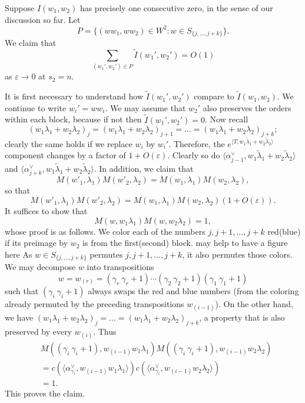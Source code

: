 \documentclass[11pt]{amsart}
\numberwithin{theorem}{section}
\numberwithin{equation}{section}
\theoremstyle{remark}
\theoremstyle{definition}
\begin{document}
{Suppose $I(w_1,w_2)$ has precisely one consecutive zero, in the sense of our discussion so far. Let
\begin{equation*}
P = \{(ww_1,ww_2) \in W^2: w \in S_{\{j,\ldots,j+k\}}\}.
\end{equation*}
We claim that
\begin{equation} \label{eq:cc}
\sum_{(w_1',w_2') \in P} \tilde I(w_1',w_2') = O(1)
\end{equation}
as $\varepsilon \rightarrow 0$ at $s_2=n$.

It is first necessary to understand how $\tilde I(w_1',w_2')$ compare to $\tilde I(w_1,w_2)$. We continue to write $w_i'=ww_i$. We may assume that $w_2'$ also preserves the orders within each block, because if not then $\tilde I(w_1',w_2')=0$. Now recall
\begin{equation*}
(w_1\lambda_1+w_2\lambda_2)_j = (w_1\lambda_1+w_2\lambda_2)_{j+1} = \ldots = (w_1\lambda_1+w_2\lambda_2)_{j+k};
\end{equation*}
clearly the same holds if we replace $w_i$ by $w_i'$. Therefore, the $e^{\langle T,w_1\tilde\lambda_1+w_2\tilde\lambda_2\rangle}$ component changes by a factor of $1+O(\varepsilon)$. Clearly so do $\langle \alpha^\vee_{j-1},w_1\tilde\lambda_1+w_2\tilde\lambda_2\rangle$ and $\langle \alpha^\vee_{j+k},w_1\tilde\lambda_1+w_2\tilde\lambda_2\rangle$. In addition, we claim that
\begin{equation*}
M(w'_1,\lambda_1)M(w'_2,\lambda_2) = M(w_1,\lambda_1)M(w_2,\lambda_2),
\end{equation*}
so that
\begin{equation*}
M(w'_1,\lambda_1)M(w'_2,\lambda_2) = M(w_1,\lambda_1)M(w_2,\lambda_2)(1+O(\varepsilon)).
\end{equation*}
It suffices to show that
\begin{equation*}
M(w,w_1\lambda_1)M(w,w_2\lambda_2)=1,
\end{equation*}
whose proof is as follows. 
We color each of the numbers $j,j+1,\ldots,j+k$ red(blue) if its preimage by $w_2$ is from the first(second) block. {\color{red} may help to have a figure here} As $w \in S_{\{j,\ldots,j+k\}}$ permutes $j,j+1,\ldots,j+k$, it also permutes those colors. We may decompose $w$ into transpositions
\begin{equation*}
w = w_{(r)} = (\gamma_r\ \gamma_r+1) \cdots (\gamma_2 \ \gamma_2+1)(\gamma_1 \ \gamma_1+1)
\end{equation*}
such that $(\gamma_i\ \gamma_i+1)$ always swaps the red and blue numbers (from the coloring already permuted by the preceding transpositions $w_{(i-1)}$). On the other hand, we have $(w_1\lambda_1+w_2\lambda_2)_j = \ldots = (w_1\lambda_1+w_2\lambda_2)_{j+k}$, a property that is also preserved by every $w_{(i)}$. Thus
\begin{align*}
&M( (\gamma_i\ \gamma_i+1), w_{(i-1)}w_1\lambda_1)M( (\gamma_i\ \gamma_i+1), w_{(i-1)}w_2\lambda_2) \\
&= c(\langle \alpha^\vee_{\gamma_i},w_{(i-1)}w_1\lambda_1\rangle)c(\langle \alpha^\vee_{\gamma_i},w_{(i-1)}w_2\lambda_2\rangle)\\
&=1.
\end{align*}
This proves the claim.

}
\end{document}
